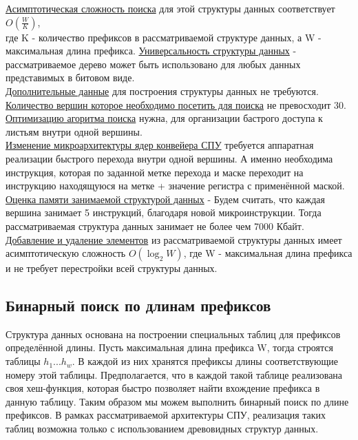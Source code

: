 \documentclass[a4peper, 12pt, titlepage, finall]{report}
\begin{document}
            \underline{Асимптотическая сложность поиска} для этой структуры данных соответствует {\ttfamily $O(\frac{W}{K})$},\\
            где {\ttfamily K} - количество префиксов в рассматриваемой структуре данных, а {\ttfamily W} - максимальная длина префикса.
            \underline{Универсальность структуры данных} - рассматриваемое дерево может быть использовано для любых данных представимых в битовом виде.\\
            \underline{Дополнительные данные} для построения структуры данных не требуются.\\
            \underline{Количество вершин которое необходимо посетить для поиска} не превосходит 30.\\
            \underline{Оптимизацию агоритма поиска} нужна, для организации бастрого доступа к листьям внутри одной вершины.\\ 
            \underline{Изменение микроархитектуры ядер конвейера СПУ} требуется аппаратная реализации быстрого перехода внутри одной вершины.
            А именно необходима инструкция, которая по заданной метке перехода и маске переходит на инструкцию находящуюся на метке + значение регистра с применённой маской.\\
            \underline{Оценка памяти занимаемой структурой данных} - Будем считать, что каждая вершина занимает 5 инструкций, благодаря новой микроинструкции.
            Тогда рассматриваемая структура данных занимает не более чем 7000 Кбайт.\\
            \underline{Добавление и удаление элементов} из рассматриваемой структуры данных имеет асимптотическую сложность 
            {\ttfamily $O(\log_2{W})$}, где {\ttfamily W} - максимальная длина префикса и не требует перестройки всей структуры данных.\\
            

        \subsection{Бинарный поиск по длинам префиксов}
            Структура данных основана на построении специальных таблиц для префиксов определённой длины. Пусть максимальная длина префикса {\ttfamily W}, 
            тогда строятся таблицы {\ttfamily $h_{1}...h_{w}$}. В каждой из них хранятся префиксы длины соответствующие номеру этой таблицы. Предполагается, 
            что в каждой такой таблице реализована своя хеш-функция, которая быстро позволяет найти вхождение префикса в данную таблицу.
            Таким образом мы можем выполнить бинарный поиск по длине префиксов. В рамках рассматриваемой архитектуры СПУ, реализация таких таблиц возможна только
            с использованием древовидных структур данных.
\end{document}
